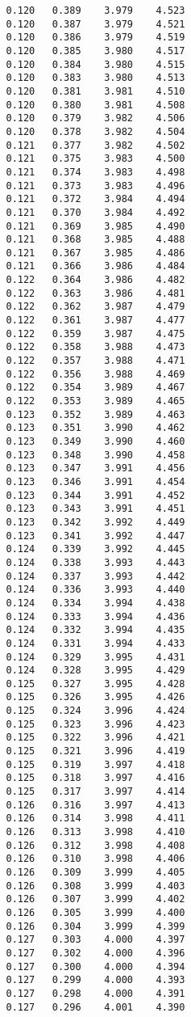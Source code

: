 \begin{verbatim}
   0.120   0.389    3.979    4.523
   0.120   0.387    3.979    4.521
   0.120   0.386    3.979    4.519
   0.120   0.385    3.980    4.517
   0.120   0.384    3.980    4.515
   0.120   0.383    3.980    4.513
   0.120   0.381    3.981    4.510
   0.120   0.380    3.981    4.508
   0.120   0.379    3.982    4.506
   0.120   0.378    3.982    4.504
   0.121   0.377    3.982    4.502
   0.121   0.375    3.983    4.500
   0.121   0.374    3.983    4.498
   0.121   0.373    3.983    4.496
   0.121   0.372    3.984    4.494
   0.121   0.370    3.984    4.492
   0.121   0.369    3.985    4.490
   0.121   0.368    3.985    4.488
   0.121   0.367    3.985    4.486
   0.121   0.366    3.986    4.484
   0.122   0.364    3.986    4.482
   0.122   0.363    3.986    4.481
   0.122   0.362    3.987    4.479
   0.122   0.361    3.987    4.477
   0.122   0.359    3.987    4.475
   0.122   0.358    3.988    4.473
   0.122   0.357    3.988    4.471
   0.122   0.356    3.988    4.469
   0.122   0.354    3.989    4.467
   0.122   0.353    3.989    4.465
   0.123   0.352    3.989    4.463
   0.123   0.351    3.990    4.462
   0.123   0.349    3.990    4.460
   0.123   0.348    3.990    4.458
   0.123   0.347    3.991    4.456
   0.123   0.346    3.991    4.454
   0.123   0.344    3.991    4.452
   0.123   0.343    3.991    4.451
   0.123   0.342    3.992    4.449
   0.123   0.341    3.992    4.447
   0.124   0.339    3.992    4.445
   0.124   0.338    3.993    4.443
   0.124   0.337    3.993    4.442
   0.124   0.336    3.993    4.440
   0.124   0.334    3.994    4.438
   0.124   0.333    3.994    4.436
   0.124   0.332    3.994    4.435
   0.124   0.331    3.994    4.433
   0.124   0.329    3.995    4.431
   0.124   0.328    3.995    4.429
   0.125   0.327    3.995    4.428
   0.125   0.326    3.995    4.426
   0.125   0.324    3.996    4.424
   0.125   0.323    3.996    4.423
   0.125   0.322    3.996    4.421
   0.125   0.321    3.996    4.419
   0.125   0.319    3.997    4.418
   0.125   0.318    3.997    4.416
   0.125   0.317    3.997    4.414
   0.126   0.316    3.997    4.413
   0.126   0.314    3.998    4.411
   0.126   0.313    3.998    4.410
   0.126   0.312    3.998    4.408
   0.126   0.310    3.998    4.406
   0.126   0.309    3.999    4.405
   0.126   0.308    3.999    4.403
   0.126   0.307    3.999    4.402
   0.126   0.305    3.999    4.400
   0.126   0.304    3.999    4.399
   0.127   0.303    4.000    4.397
   0.127   0.302    4.000    4.396
   0.127   0.300    4.000    4.394
   0.127   0.299    4.000    4.393
   0.127   0.298    4.000    4.391
   0.127   0.296    4.001    4.390

\end{verbatim}
